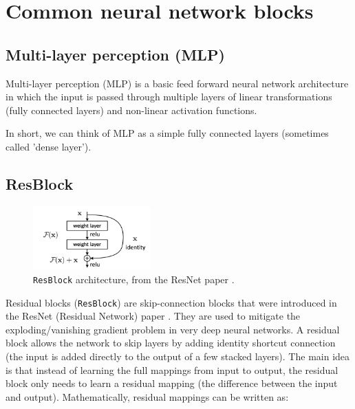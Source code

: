 \section{Common neural network blocks}
\label{appendix:blocks}



\subsection{Multi-layer perception (MLP)}

Multi-layer perception (MLP) is a basic feed forward neural network architecture in which the input is passed through multiple layers of linear transformations (fully connected layers) and non-linear activation functions.

In short, we can think of MLP as a simple fully connected layers (sometimes called 'dense layer').








\subsection{ResBlock}

\begin{figure}
    \centering
    \includegraphics[width=0.4\textwidth]{images/appendix/blocks/resnet.png}
    \caption{\texttt{ResBlock} architecture, from the ResNet paper \cite{resnet}.}
    \label{fig:appendix_blocks_residual_block}
\end{figure}

Residual blocks (\texttt{ResBlock}) are skip-connection blocks that were introduced in the ResNet (Residual Network) paper \cite{resnet}. They are used to mitigate the exploding/vanishing gradient problem in very deep neural networks. A residual block allows the network to skip layers by adding identity shortcut connection (the input is added directly to the output of a few stacked layers). The main idea is that instead of learning the full mappings from input to output, the residual block only needs to learn a residual mapping (the difference between the input and output). Mathematically, residual mappings can be written as:

